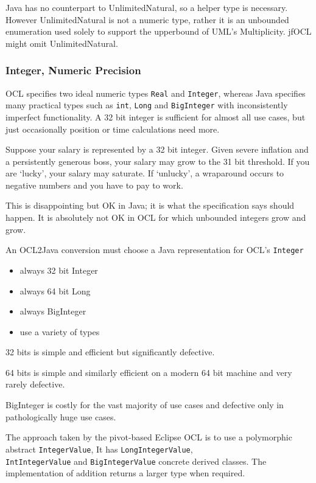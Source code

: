 \documentclass[sigconf]{acmart}
\begin{document}
Java has no counterpart to UnlimitedNatural, so a helper type is necessary. However UnlimitedNatural is not a numeric type, rather it is an unbounded enumeration used solely to support the upperbound of UML's Multiplicity. jfOCL might omit UnlimitedNatural.

\subsubsection{Integer, Numeric Precision}

OCL specifies two ideal numeric types \texttt{Real} and \texttt{Integer}, whereas Java specifies many practical types such as \texttt{int}, \texttt{Long} and \texttt{BigInteger} with inconsistently imperfect functionality. A 32 bit integer is sufficient for almost all use cases, but just occasionally position or time calculations need more.

Suppose your salary is represented by a 32 bit integer. Given severe inflation and a persistently generous boss, your salary may grow to the 31 bit threshold. If you are `lucky', your salary may saturate. If `unlucky', a wraparound occurs to negative numbers and you have to pay to work. 

This is disappointing but OK in Java; it is what the specification says should happen. It is absolutely not OK in OCL for which unbounded integers grow and grow.

An OCL2Java conversion must choose a Java representation for OCL's \texttt{Integer}
\begin{itemize}
	\item always 32 bit Integer
	\item always 64 bit Long
	\item always BigInteger
	\item use a variety of types
\end{itemize}

32 bits is simple and efficient but significantly defective.

64 bits is simple and similarly efficient on a modern 64 bit machine and very rarely defective.

BigInteger is costly for the vast majority of use cases and defective only in pathologically huge use cases.

The approach taken by the pivot-based Eclipse OCL is to use a polymorphic abstract \texttt{IntegerValue}, It has \texttt{LongIntegerValue},\\ \texttt{IntIntegerValue} and \texttt{BigIntegerValue} concrete derived classes. The implementation of addition returns a larger type when required.
\end{document}
